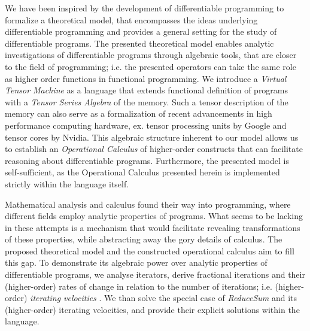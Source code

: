 We have been inspired by the development of differentiable programming to formalize a theoretical model, that encompasses the ideas underlying differentiable programming and provides a general setting for the study of differentiable programs. The presented theoretical model enables analytic investigations of differentiable programs through algebraic tools, that are closer to the field of programming; i.e. the presented operators can take the same role as higher order functions in functional programming. We introduce a \emph{Virtual Tensor Machine} as a language that extends functional definition of programs with a \emph{Tensor Series Algebra} of the memory. Such a tensor description of the memory can also serve as a formalization of recent advancements in high performance computing hardware, ex. tensor processing units by Google and tensor cores by Nvidia. This algebraic structure inherent to our model allows us to establish an \emph{Operational Calculus} of higher-order constructs that can facilitate reasoning about differentiable programs. Furthermore, the presented model is self-sufficient, as the Operational Calculus presented herein is implemented strictly within the language itself.

Mathematical analysis and calculus found their way into programming, where different fields employ analytic properties of programs. What seems to be lacking in these attempts is a mechanism that would facilitate revealing transformations of these properties, while abstracting away the gory details of calculus. The proposed theoretical model and the constructed operational calculus aim to fill this gap. To demonstrate its algebraic power over analytic properties of differentiable programs, we analyse iterators, derive fractional iterations and their (higher-order) rates of change in relation to the number of iterations; i.e. (higher-order) \emph{ iterating velocities }. We than solve the special case of \emph{ReduceSum} and its (higher-order) iterating velocities, and provide their explicit solutions within the language.


